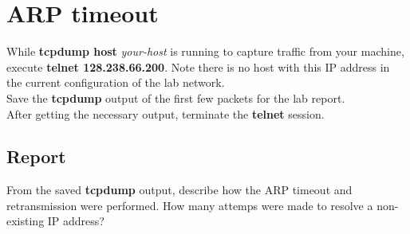 \documentclass{../UTNetLab}
\begin{document}
\section{ARP timeout}
    While \textbf{tcpdump host} \textit{your-host} is running to capture traffic from your machine, execute \textbf{telnet 128.238.66.200}.
    Note there is no host with this IP address in the current configuration of the lab network. \\
    Save the \textbf{tcpdump} output of the first few packets for the lab report. \\
    After getting the necessary output, terminate the \textbf{telnet} session.
    \subsection*{Report}
    From the saved \textbf{tcpdump} output, describe how the ARP timeout and retransmission were performed.
    How many attemps were made to resolve a non-existing IP address?
\end{document}

